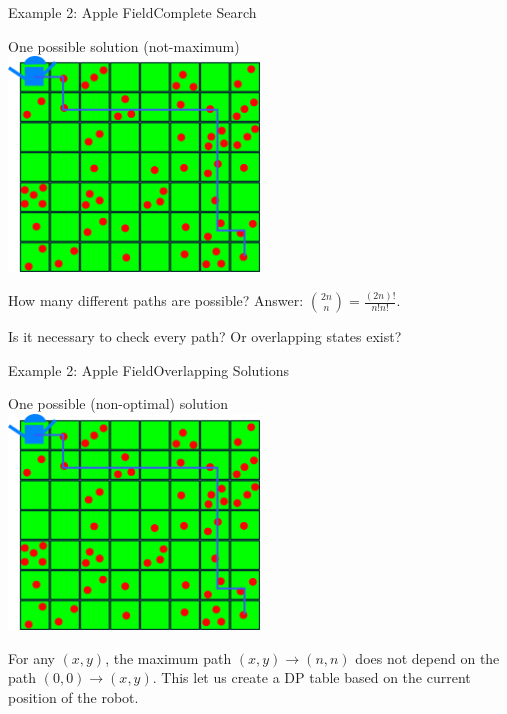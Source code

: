\begin{frame}{Example 2: Apple Field}{Complete Search}

  \begin{center}
    {\smaller One possible solution (not-maximum)}\\
    \includegraphics[width=0.5\textwidth]{../img/applefield-solution}
  \end{center}

  How many different paths are possible? Answer: $\binom{2n}{n} = \frac{(2n)!}{n!n!}$.
  \bigskip

  Is it necessary to check every path? Or overlapping states exist?
\end{frame}

\begin{frame}{Example 2: Apple Field}{Overlapping Solutions}
  \begin{center}
    {\smaller One possible (non-optimal) solution}\\
    \includegraphics[width=0.5\textwidth]{../img/applefield-solution}
  \end{center}

  {\smaller
  For any $(x,y)$, the maximum path $(x,y) \to (n,n)$ does not depend on the path $(0,0) \to (x,y)$. This let us create a DP table based on the current position of the robot.}
\end{frame}


